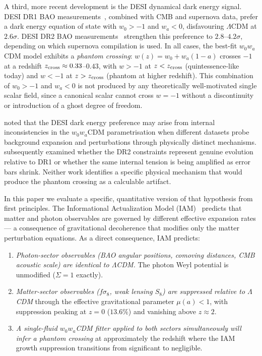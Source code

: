 \documentclass[12pt,a4paper]{article}
\newcommand{\lcdm}{$\Lambda$CDM}
\begin{document}
A third, more recent development is the DESI dynamical dark energy signal.
DESI DR1 BAO measurements~\citep{DESI2024DR1BAO,DESI2024DR1cosmo}, combined
with CMB and supernova data, prefer a dark energy equation of state with
$w_0 > -1$ and $w_a < 0$, disfavouring \lcdm{} at $2.6\sigma$.
DESI DR2 BAO measurements~\citep{DESI2025DR2BAO} strengthen this preference to
$2.8$--$4.2\sigma$, depending on which supernova compilation is used.
In all cases, the best-fit $w_0 w_a$CDM model exhibits a \textit{phantom crossing}:
$w(z) = w_0 + w_a(1-a)$ crosses $-1$ at a redshift
$z_{\rm cross} \approx 0.33$--$0.43$, with $w > -1$ at $z < z_{\rm cross}$
(quintessence-like today) and $w < -1$ at $z > z_{\rm cross}$ (phantom at
higher redshift).
This combination of $w_0 > -1$ and $w_a < 0$ is not produced by any
theoretically well-motivated single scalar field, since a canonical scalar
cannot cross $w = -1$ without a discontinuity or introduction of a ghost
degree of freedom.

\citet{Ocolgain2024} noted that the DESI dark energy preference may arise from
internal inconsistencies in the $w_0 w_a$CDM parametrisation when different
datasets probe background expansion and perturbations through physically
distinct mechanisms.
\citet{Ocolgain2025} subsequently examined whether the DR2 constraints
represent genuine evolution relative to DR1 or whether the same internal
tension is being amplified as error bars shrink.
Neither work identifies a specific physical mechanism that would produce
the phantom crossing as a calculable artifact.

In this paper we evaluate a specific, quantitative version of that
hypothesis from first principles.
The Informational Actualization Model (IAM)~\citep{Mahaffey2026preprint}
predicts that matter and photon observables are governed by different
effective expansion rates --- a consequence of gravitational decoherence
that modifies only the matter perturbation equations.
As a direct consequence, IAM predicts:

\begin{enumerate}
\item \textit{Photon-sector observables (BAO angular positions, comoving
  distances, CMB acoustic scale) are identical to \lcdm{}.}
  The photon Weyl potential is unmodified ($\Sigma = 1$ exactly).

\item \textit{Matter-sector observables ($f\sigma_8$, weak lensing $S_8$) are
  suppressed relative to \lcdm{}} through the effective gravitational parameter
  $\mu(a) < 1$, with suppression peaking at $z = 0$ ($13.6\%$) and vanishing
  above $z \approx 2$.

\item \textit{A single-fluid $w_0 w_a$CDM fitter applied to both sectors
  simultaneously will infer a phantom crossing} at approximately the redshift
  where the IAM growth suppression transitions from significant to negligible.
\end{enumerate}
\end{document}

